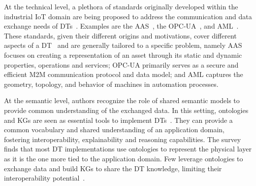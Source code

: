 At the technical level, a plethora of standards originally developed within the industrial \ac{IoT} domain are being proposed to address the communication and data exchange needs of \acp{DT}~\cite{Barnard_2024}.
%
Examples are the \ac{AAS}~\cite{platform_i40_aas_part1_v2}, the \ac{OPC-UA}~\cite{mahnke2009opc}, and \ac{AML}~\cite{DBLP:conf/etfa/DrathLPH08}.
%
These standards, given their different origins and motivations, cover different aspects of a \ac{DT}~\cite{Barnard_2024} and are generally tailored to a specific problem, namely \ac{AAS} focuses on creating a representation of an asset through its static and dynamic properties, operations and services;
\ac{OPC-UA} primarily serves as a secure and efficient \ac{M2M} communication protocol and data model; and \ac{AML} captures the geometry, topology, and behavior of machines in automation processes.


At the semantic level, authors recognize the role of shared semantic models to provide common understanding of the exchanged data.
%
In this setting, ontologies and \acp{KG} are seen as essential tools to implement \acp{DT}~\cite{Karabulut_Pileggi_Groth_Degeler_2024}. They can provide a common vocabulary and shared understanding of an application domain, fostering interoperability, explainability and reasoning capabilities.
%
The survey finds that most \ac{DT} implementations use ontologies to represent the physical layer as it is the one more tied to the application domain. Few leverage ontologies to exchange data and build \acp{KG} to share the \ac{DT} knowledge, limiting their interoperability potential~\cite{Karabulut_Pileggi_Groth_Degeler_2024}.

%



